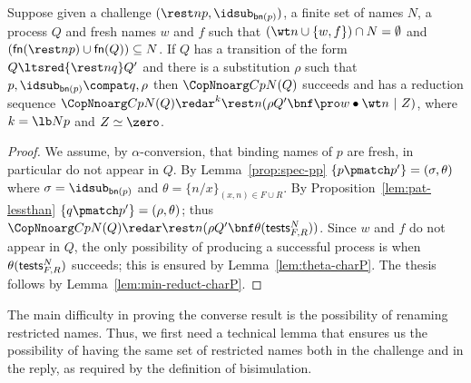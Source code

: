 \documentclass{LMCS}
\renewcommand{\beq}{\simeq}
\begin{document}
\begin{prop}
\label{thm:lts-2-reply-succeed}
Suppose given a challenge $(\rest n p,\idsub_{{\sf bn}(p)})$, a finite set of names $N$, a process $Q$ and fresh names $w$ and $f$ such that 
$(\wt n \cup \{w,f\}) \cap N = \emptyset$ and $({\sf fn}(\rest n p) \cup {\sf fn}(Q)) \subseteq N$.
If $Q$ has a transition of the form $Q\ltsred{\rest n q}Q'$ and there is a substitution $\rho$ such that
$p,\idsub_{{\sf bn}(p)}\compat q,\rho$ then
$\CopNnoarg C p N (Q)$ succeeds and has a reduction sequence
$\CopNnoarg C p N (Q)\redar^k \rest n(\rho Q'\bnf\pro w\bullet\wt n\ |\ Z)$, where $k=\lb N p$ and $Z \beq \zero$.
\end{prop}
\begin{proof}
We assume, by $\alpha$-conversion, that binding names of $p$ are fresh, in particular do not appear in $Q$.
By Lemma~\ref{prop:spec-pp} $\{p\pmatch p'\}=(\sigma,\theta)$ where $\sigma=\idsub_{{\sf bn}(p)}$ and $\theta= \{n/x\}_{(x,n) \in F \cup R}$.
By Proposition~\ref{lem:pat-lessthan} $\{q\pmatch p'\}=(\rho,\theta)$; thus $\CopNnoarg C p N (Q)\redar \rest n (\rho Q'\bnf \theta ({\sf tests}^N_{F,R}))$. Since $w$ and $f$ do not appear in $Q$, the only possibility of producing a successful
process is when $\theta ({\sf tests}^N_{F,R})$ succeeds; this is ensured by Lemma~\ref{lem:theta-charP}. The thesis follows by Lemma~\ref{lem:min-reduct-charP}.
\end{proof}

The main difficulty in proving the converse result is the possibility of renaming restricted names. 
Thus, we first need a technical lemma that ensures us the possibility of having the same set of restricted 
names both in the challenge and in the reply, as required by the definition of bisimulation.
\end{document}
